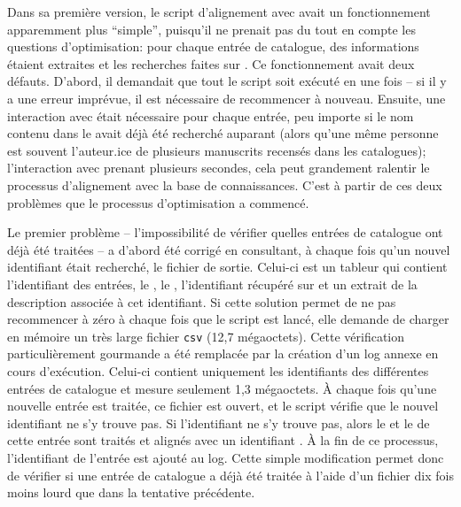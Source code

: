 Dans sa première version, le script d'alignement avec \wkd{} avait un fonctionnement apparemment plus \enquote{simple}, puisqu'il ne prenait pas du tout en compte les questions d'optimisation: pour chaque entrée de catalogue, des informations étaient extraites et les recherches faites sur \wkd{}. Ce fonctionnement avait deux défauts. D'abord, il demandait que tout le script soit exécuté en une fois -- si il y a une erreur imprévue, il est nécessaire de recommencer à nouveau. Ensuite, une interaction avec \wkd{} était nécessaire pour chaque entrée, peu importe si le nom contenu dans le \tname{} avait déjà été recherché auparant (alors qu'une même personne est souvent l'auteur.ice de plusieurs manuscrits recensés dans les catalogues); l'interaction avec \wkd{} prenant plusieurs secondes, cela peut grandement ralentir le processus d'alignement avec la base de connaissances. C'est à partir de ces deux problèmes que le processus d'optimisation a commencé.

Le premier problème -- l'impossibilité de vérifier quelles entrées de catalogue ont déjà été traitées -- a d'abord été corrigé en consultant, à chaque fois qu'un nouvel identifiant était recherché, le fichier de sortie. Celui-ci est un tableur qui contient l'identifiant des entrées, le \tname{}, le \ttrait{}, l'identifiant récupéré sur \wkd{} et un extrait de la description associée à cet identifiant. Si cette solution permet de ne pas recommencer à zéro à chaque fois que le script est lancé, elle demande de charger en mémoire un très large fichier \texttt{csv} (12,7 mégaoctets). Cette vérification particulièrement gourmande a été remplacée par la création d'un \gls{log} annexe en cours d'exécution. Celui-ci contient uniquement les identifiants des différentes entrées de catalogue et mesure seulement 1,3 mégaoctets. À chaque fois qu'une nouvelle entrée est traitée, ce fichier est ouvert, et le script vérifie que le nouvel identifiant ne s'y trouve pas. Si l'identifiant ne s'y trouve pas, alors le \tname{} et le \ttrait{} de cette entrée sont traités et alignés avec un identifiant \wkd{}. À la fin de ce processus, l'identifiant \tei{} de l'entrée est ajouté au \gls{log}. Cette simple modification permet donc de vérifier si une entrée de catalogue a déjà été traitée à l'aide d'un fichier dix fois moins lourd que dans la tentative précédente.

